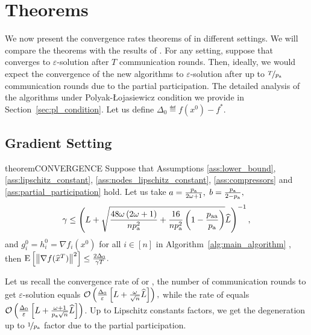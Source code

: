 \documentclass{article}
\newcommand{\algorithmname}{DASHA-PP}
\newcommand*{\probavailable}{\ensuremath{p_{\textnormal{a}}}}
\newcommand*{\probpairaa}{\ensuremath{p_{\textnormal{aa}}}}
\begin{document}
\section{Theorems}

\label{sec:theorems}

We now present the convergence rates theorems of \algname{\algorithmname} in different settings. We will compare the theorems with the results of . For any setting, suppose that  converges to $\varepsilon$-solution after $T$ communication rounds. Then, ideally, we would expect the convergence of the new algorithms to $\varepsilon$-solution after up to $\nicefrac{T}{\probavailable}$ communication rounds due to the partial participation. The detailed analysis of the algorithms under Polyak-\L ojasiewicz condition we provide in Section~\ref{sec:pl_condition}. Let us define $\Delta_0 \eqdef f(x^0) - f^*.$

\subsection{Gradient Setting}

\label{sec:gradien_setting}

\begin{restatable}{theorem}{CONVERGENCE}
  \label{theorem:gradient_oracle}
  Suppose that Assumptions \ref{ass:lower_bound}, \ref{ass:lipschitz_constant}, \ref{ass:nodes_lipschitz_constant}, \ref{ass:compressors} and \ref{ass:partial_participation} hold. Let us take $a = \frac{\probavailable}{2 \omega + 1} ,$ $b = \frac{\probavailable}{2 - \probavailable},$ $$\gamma \leq \left(L + \sqrt{\frac{48 \omega \left(2 \omega + 1\right)}{n \probavailable^2} + \frac{16}{n \probavailable^2}\left(1 - \frac{\probpairaa}{\probavailable}\right)}\widehat{L}\right)^{-1},$$ and $g^{0}_i = h^{0}_i = \nabla f_i(x^0)$ for all $i \in [n]$
  in Algorithm~\ref{alg:main_algorithm} \algname{(\algorithmname)}, then ${\rm E}\left[\left\| \nabla f(\widehat{x}^T) \right\|^2\right] \leq \frac{2 \Delta_0}{\gamma T}.$
\end{restatable}

Let us recall the convergence rate of  or , the number of communication rounds to get $\varepsilon$-solution equals
$\mathcal{O}\left(\frac{\Delta_0}{\varepsilon}\left[L + \frac{\omega}{\sqrt{n}}\widehat{L}\right]\right),$ while the rate of \algname{\algorithmname} equals $\cO\left(\frac{\Delta_0}{\varepsilon}\left[L + \frac{\omega + 1}{\probavailable \sqrt{n}}\widehat{L}\right]\right)$. Up to Lipschitz constants factors, we get the degeneration up to $\nicefrac{1}{\probavailable}$ factor due to the partial participation.
\end{document}
